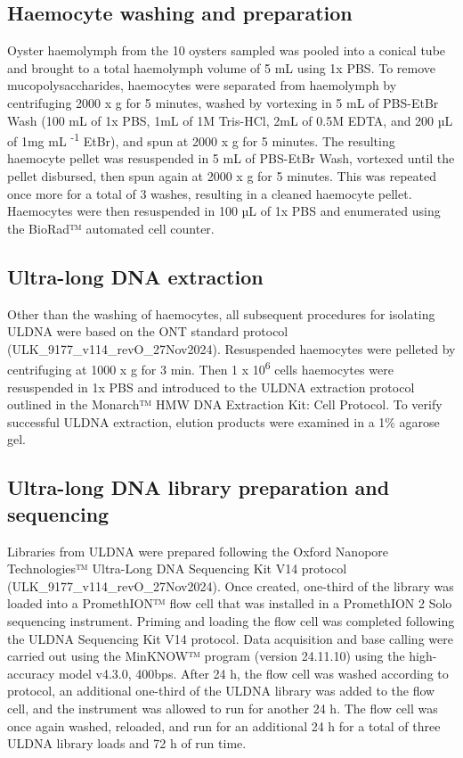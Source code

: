 \documentclass[lineno,referee,pdflatex,sn-basic]{sn-jnl}%
\begin{document}
\subsection{Haemocyte washing and preparation}
Oyster haemolymph from the 10 oysters sampled was pooled into a conical tube and brought to a total haemolymph volume of 5 mL using 1x PBS. To remove mucopolysaccharides, haemocytes were separated from haemolymph by centrifuging 2000 x g for 5 minutes, washed by vortexing in 5 mL of PBS-EtBr Wash (100 mL of 1x PBS, 1mL of 1M Tris-HCl, 2mL of 0.5M EDTA, and 200 µL of 1mg mL \textsuperscript{-1} EtBr), and spun at 2000 x g for 5 minutes. The resulting haemocyte pellet was resuspended in 5 mL of PBS-EtBr Wash, vortexed until the pellet disbursed, then spun again at 2000 x g for 5 minutes. This was repeated once more for a total of 3 washes, resulting in a cleaned haemocyte pellet. Haemocytes were then resuspended in 100 µL of 1x PBS and enumerated using the BioRad™ automated cell counter.

\subsection{Ultra-long DNA extraction}
Other than the washing of haemocytes, all subsequent procedures for isolating ULDNA were based on the ONT standard protocol (ULK\_9177\_v114\_revO\_27Nov2024). Resuspended haemocytes were pelleted by centrifuging at 1000 x g for 3 min. Then 1 x 10\textsuperscript{6} cells haemocytes were resuspended in 1x PBS and introduced to the ULDNA extraction protocol outlined in the Monarch™ HMW DNA Extraction Kit: Cell Protocol. To verify successful ULDNA extraction, elution products were examined in a 1\% agarose gel.

\subsection{Ultra-long DNA library preparation and sequencing}
Libraries from ULDNA were prepared following the Oxford Nanopore Technologies™ Ultra-Long DNA Sequencing Kit V14 protocol (ULK\_9177\_v114\_revO\_27Nov2024). Once created, one-third of the library was loaded into a PromethION™ flow cell that was installed in a PromethION 2 Solo sequencing instrument. Priming and loading the flow cell was completed following the ULDNA Sequencing Kit V14 protocol. Data acquisition and base calling were carried out using the MinKNOW™ program (version 24.11.10) using the high-accuracy model v4.3.0, 400bps. After 24 h, the flow cell was washed according to protocol, an additional one-third of the ULDNA library was added to the flow cell, and the instrument was allowed to run for another 24 h. The flow cell was once again washed, reloaded, and run for an additional 24 h for a total of three ULDNA library loads and 72 h of run time.
\end{document}
